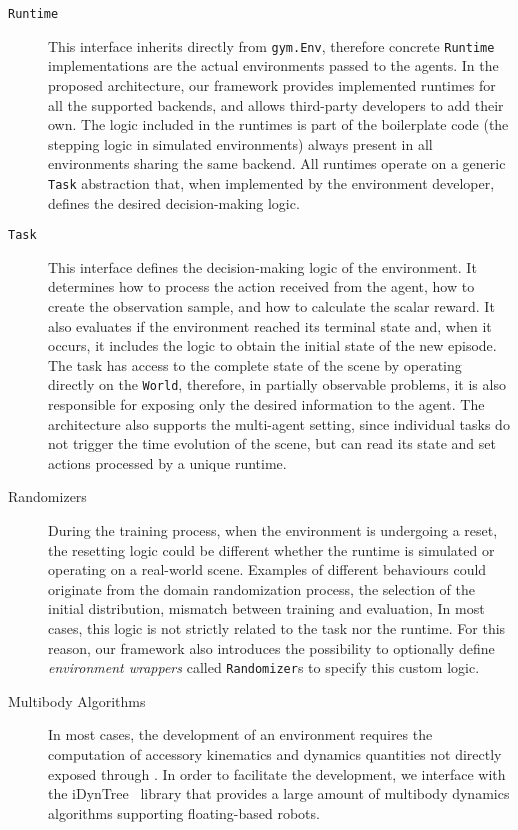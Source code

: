 \begin{description}
%
\item[\texttt{\MakeUppercase{R}untime}]
This interface inherits directly from \verb|gym.Env|, therefore concrete \verb|Runtime| implementations are the actual environments passed to the agents.
In the proposed architecture, our framework provides implemented runtimes for all the supported backends, and allows third-party developers to add their own.
The logic included in the runtimes is part of the boilerplate code (\eg the stepping logic in simulated environments) always present in all environments sharing the same backend.
All runtimes operate on a generic \verb|Task| abstraction that, when implemented by the environment developer, defines the desired decision-making logic.
%
\item[\texttt{\MakeUppercase{T}ask}]
This interface defines the decision-making logic of the environment.
It determines how to process the action received from the agent, how to create the observation sample, and how to calculate the scalar reward.
It also evaluates if the environment reached its terminal state and, when it occurs, it includes the logic to obtain the initial state of the new episode.
The task has access to the complete state of the scene by operating directly on the \verb|World|, therefore, in partially observable problems, it is also responsible for exposing only the desired information to the agent.
The architecture also supports the multi-agent setting, since individual tasks do not trigger the time evolution of the scene, but can read its state and set actions processed by a unique runtime.
%
\item[Randomizers]
During the training process, when the environment is undergoing a reset, the resetting logic could be different whether the runtime is simulated or operating on a real-world scene.
Examples of different behaviours could originate from the domain randomization process, the selection of the initial distribution, mismatch between training and evaluation, \etc In most cases, this logic is not strictly related to the task nor the runtime.
For this reason, our framework also introduces the possibility to optionally define \emph{environment wrappers} called \verb|Randomizer|s to specify this custom logic.
%
\item[Multibody Algorithms]
In most cases, the development of an environment requires the computation of accessory kinematics and dynamics quantities not directly exposed through \scenario.
In order to facilitate the development, we interface with the iDynTree~\parencite{nori_icub_2015} library that provides a large amount of multibody dynamics algorithms supporting floating-based robots.
%
\end{description}

